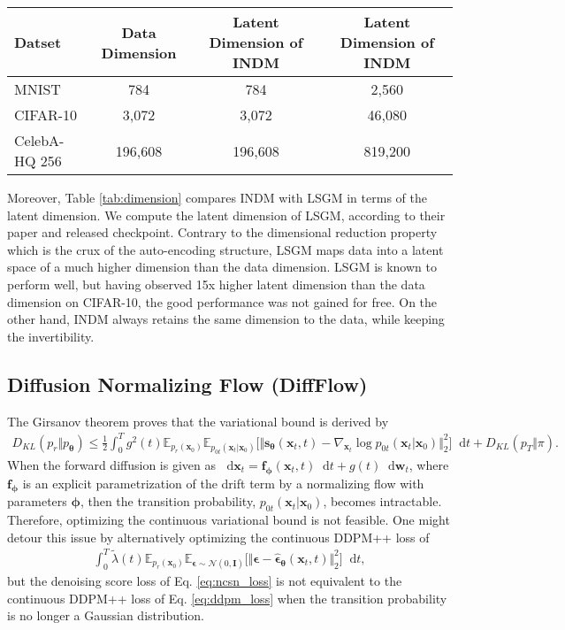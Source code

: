 \documentclass{article}
\theoremstyle{definition}
\theoremstyle{remark}
\newcommand*\diff{\mathop{}\!\mathrm{d}}
\begin{document}
	\begin{table*}[t]
		\caption{Comparison of latent dimension of INDM and LSGM.}
		\label{tab:dimension}
		\scriptsize
		\centering
		\begin{tabular}{lccc}
			\toprule
			Datset & Data Dimension & Latent Dimension of INDM & Latent Dimension of INDM \\\midrule
			MNIST & 784 & 784 & 2,560 \\
			CIFAR-10 & 3,072 & 3,072 & 46,080 \\
			CelebA-HQ 256 & 196,608 & 196,608 & 819,200 \\
			\bottomrule
		\end{tabular}
	\end{table*}
	Moreover, Table \ref{tab:dimension} compares INDM with LSGM in terms of the latent dimension. We compute the latent dimension of LSGM, according to their paper and released checkpoint. Contrary to the dimensional reduction property which is the crux of the auto-encoding structure, LSGM maps data into a latent space of a much higher dimension than the data dimension. LSGM is known to perform well, but having observed 15x higher latent dimension than the data dimension on CIFAR-10, the good performance was not gained for free. On the other hand, INDM always retains the same dimension to the data, while keeping the invertibility.
	
	\subsection{Diffusion Normalizing Flow (DiffFlow)}\label{appendix:DiffFlow}
	
	The Girsanov theorem \cite{sarkka2019applied} proves that the variational bound is derived by
	\begin{align}\label{eq:ncsn_loss}
	D_{KL}(p_{r}\Vert p_{\bm{\theta}})\le \frac{1}{2}\int_{0}^{T}g^{2}(t)\mathbb{E}_{p_{r}(\mathbf{x}_{0})}\mathbb{E}_{p_{0t}(\mathbf{x}_{t}\vert\mathbf{x}_{0})}\big[\Vert\mathbf{s}_{\bm{\theta}}(\mathbf{x}_{t},t)-\nabla_{\mathbf{x}_{t}}\log{p_{0t}(\mathbf{x}_{t}\vert\mathbf{x}_{0})}\Vert_{2}^{2}\big]\diff t+D_{KL}(p_{T}\Vert\pi).
	\end{align}
	When the forward diffusion is given as $\diff\mathbf{x}_{t}=\mathbf{f}_{\bm{\phi}}(\mathbf{x}_{t},t)\diff t+g(t)\diff\mathbf{w}_{t}$, where $\mathbf{f}_{\bm{\phi}}$ is an explicit parametrization of the drift term by a normalizing flow with parameters $\bm{\phi}$, then the transition probability, $p_{0t}(\mathbf{x}_{t}\vert\mathbf{x}_{0})$, becomes intractable. Therefore, optimizing the continuous variational bound is not feasible. One might detour this issue by alternatively optimizing the continuous DDPM++ loss of
	\begin{align}\label{eq:ddpm_loss}
	\int_{0}^{T}\tilde{\lambda}(t)\mathbb{E}_{p_{r}(\mathbf{x}_{0})}\mathbb{E}_{\bm{\epsilon}\sim\mathcal{N}(0,\mathbf{I})}\big[\Vert\bm{\epsilon}-\bm{\hat{\epsilon}}_{\bm{\theta}}(\mathbf{x}_{t},t)\Vert_{2}^{2}\big]\diff t,
	\end{align}
	but the denoising score loss of Eq. \eqref{eq:ncsn_loss} is not equivalent to the continuous DDPM++ loss of Eq. \eqref{eq:ddpm_loss} when the transition probability is no longer a Gaussian distribution.
	
\end{document}
